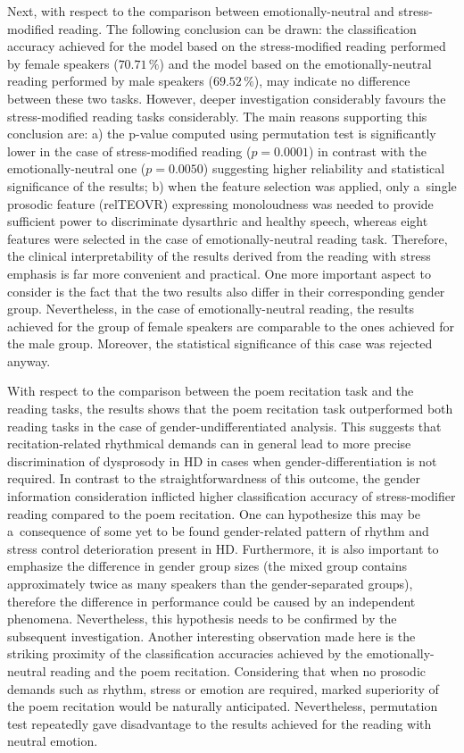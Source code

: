 Next, with respect to the comparison between emotionally-neutral and stress-modified reading. The following conclusion can be drawn: the classification accuracy achieved for the model based on the stress-modified reading performed by female speakers ($70.71\,\%$) and the model based on the emotionally-neutral reading performed by male speakers ($69.52\,\%$), may indicate no difference between these two tasks. However, deeper investigation considerably favours the stress-modified reading tasks considerably. The main reasons supporting this conclusion are: a) the p-value computed using permutation test is significantly lower in the case of stress-modified reading ($p=0.0001$) in contrast with the emotionally-neutral one ($p=0.0050$) suggesting higher reliability and statistical significance of the results; b) when the feature selection was applied, only a~single prosodic feature (relTEOVR) expressing monoloudness was needed to provide sufficient power to discriminate dysarthric and healthy speech, whereas eight features were selected in the case of emotionally-neutral reading task. Therefore, the clinical interpretability of the results derived from the reading with stress emphasis is far more convenient and practical. One more important aspect to consider is the fact that the two results also differ in their corresponding gender group. Nevertheless, in the case of emotionally-neutral reading, the results achieved for the group of female speakers are comparable to the ones achieved for the male group. Moreover, the statistical significance of this case was rejected anyway.

With respect to the comparison between the poem recitation task and the reading tasks, the results shows that the poem recitation task outperformed both reading tasks in the case of gender-undifferentiated analysis. This suggests that recitation-related rhythmical demands can in general lead to more precise discrimination of dysprosody in HD in cases when gender-differentiation is not required. In contrast to the straightforwardness of this outcome, the gender information consideration inflicted higher classification accuracy of stress-modifier reading compared to the poem recitation. One can hypothesize this may be a~consequence of some yet to be found gender-related pattern of rhythm and stress control deterioration present in HD. Furthermore, it is also important to emphasize the difference in gender group sizes (the mixed group contains approximately twice as many speakers than the gender-separated groups), therefore the difference in performance could be caused by an independent phenomena. Nevertheless, this hypothesis needs to be confirmed by the subsequent investigation. Another interesting observation made here is the striking proximity of the classification accuracies achieved by the emotionally-neutral reading and the poem recitation. Considering that when no prosodic demands such as rhythm, stress or emotion are required, marked superiority of the poem recitation would be naturally anticipated. Nevertheless, permutation test repeatedly gave disadvantage to the results achieved for the reading with neutral emotion.

